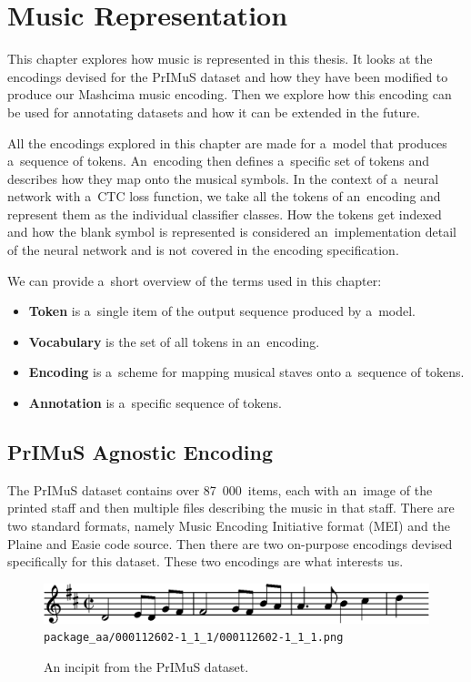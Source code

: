 \chapter{Music Representation}
\label{chap:MusicRepresentation}

This chapter explores how music is represented in this thesis. It looks at the encodings devised for the PrIMuS dataset and how they have been modified to produce our Mashcima music encoding. Then we explore how this encoding can be used for annotating datasets and how it can be extended in the future.

All the encodings explored in this chapter are made for a~model that produces a~sequence of tokens. An~encoding then defines a~specific set of tokens and describes how they map onto the musical symbols. In the context of a~neural network with a~CTC loss function, we take all the tokens of an~encoding and represent them as the individual classifier classes. How the tokens get indexed and how the blank symbol is represented is considered an~implementation detail of the neural network and is not covered in the encoding specification.

We can provide a~short overview of the terms used in this chapter:

\begin{itemize}
\item \textbf{Token} is a~single item of the output sequence produced by a~model.
\item \textbf{Vocabulary} is the set of all tokens in an~encoding.
\item \textbf{Encoding} is a~scheme for mapping musical staves onto a~sequence of tokens.
\item \textbf{Annotation} is a~specific sequence of tokens.
\end{itemize}


\section{PrIMuS Agnostic Encoding}

The PrIMuS dataset contains over 87~000~items, each with an~image of the printed staff and then multiple files describing the music in that staff. There are two standard formats, namely Music Encoding Initiative format (MEI) and the Plaine and Easie code source. Then there are two on-purpose encodings devised specifically for this dataset. These two encodings are what interests us.

\begin{figure}[h]
    \centering
    \includegraphics[width=140mm]{../img/primus-incipit}
    \verb`package_aa/000112602-1_1_1/000112602-1_1_1.png`
    \caption{An incipit from the PrIMuS dataset.}
    \label{fig4:PrimusIncipit}
\end{figure}

